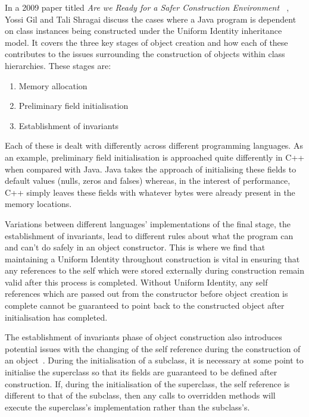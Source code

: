 In a 2009 paper titled \textit{Are we Ready for a Safer Construction Environment ~\cite{SaferConstruction}}, Yossi Gil and Tali Shragai discuss the cases where a Java program is dependent on class instances being constructed under the Uniform Identity inheritance model. It covers the three key stages of object creation and how each of these contributes to the issues surrounding the construction of objects within class hierarchies. These stages are:
\begin{enumerate}
	\item Memory allocation
	\item Preliminary field initialisation
	\item Establishment of invariants
\end{enumerate}
Each of these is dealt with differently across different programming languages. As an example, preliminary field initialisation is approached quite differently in C++ when compared with Java. Java takes the approach of initialising these fields to default values (nulls, zeros and falses) whereas, in the interest of performance, C++ simply leaves these fields with whatever bytes were already present in the memory locations.

Variations between different languages’ implementations of the final stage, the establishment of invariants, lead to different rules about what the program can and can't do safely in an object constructor. This is where we find that maintaining a Uniform Identity throughout construction is vital in ensuring that any references to the self which were stored externally during construction remain valid after this process is completed. Without Uniform Identity, any self references which are passed out from the constructor before object creation is complete cannot be guaranteed to point back to the constructed object after initialisation has completed.
\newline

The establishment of invariants phase of object construction also introduces potential issues with the changing of the self reference during the construction of an object~\cite{SaferConstruction}. During the initialisation of a subclass, it is necessary at some point to initialise the superclass so that its fields are guaranteed to be defined after construction. If, during the initialisation of the superclass, the self reference is different to that of the subclass, then any calls to overridden methods will execute the superclass's implementation rather than the subclass's.

